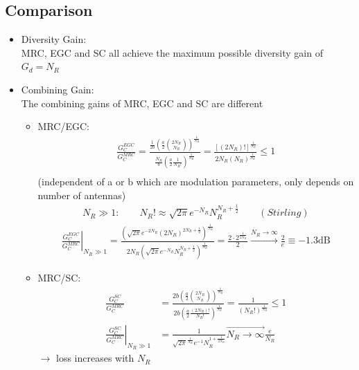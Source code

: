 \documentclass[a4paper, 10pt]{article}
\begin{document}
\subsection{Comparison}
	\begin{itemize}
		\item Diversity Gain:\\
			MRC, EGC and SC all achieve the maximum possible diversity gain of $G_d=N_R$
		\item Combining Gain:\\
			The combining gains of MRC, EGC and SC are different
			\begin{itemize}
			\item MRC/EGC:
			\begin{align*}
			\frac{G_C^{EGC}}{G_C^{MRC}}=\frac{\frac{1}{2b}\left(\frac{a}{2}\binom{2N_R}{N_R}\right)^{\frac{1}{N_R}}}{\frac{N_R}{b}\left(\frac{a}{2}\frac{1}{N_R!}\right)^{\frac{1}{N_R}}}
			=\frac{[(2N_R)!]^{\frac{1}{N_R}}}{2N_R(N_R)^{\frac{1}{N_R}}}\leq 1\\
			\end{align*}
			(independent of a or b which are modulation parameters, only depends on number of antennas)
			\begin{align*}
				N_R \gg 1: \qquad N_R!\approx \sqrt{2\pi}e^{-N_R}N_R^{N_R+\frac{1}{2}}\qquad(Stirling)
			\end{align*}
			\begin{align*}
				\left.\frac{G_C^{EGC}}{G_C^{MRC}}\right|_{N_R\gg1}
				=\frac{\left(\sqrt{2\pi}e^{-2N_R}(2N_R)^{2N_R+\frac{1}{2}}\right)^{\frac{1}{N_R}}}{2N_R\left(\sqrt{2\pi}e^{-N_R}N_R^{N_R+\frac{1}{2}}\right)^{\frac{1}{N_R}}}
				=\frac{2\cdot2^{\frac{1}{2N_R}}}{2}\overset{N_R\rightarrow\infty}{\rightarrow}\frac{2}{e}\equiv -1.3\mathrm{dB}
			\end{align*}
			\item MRC/SC:
			\begin{align*}
				\frac{G_C^{SC}}{G_C^{MRC}}
				&=\frac{2b\left(\frac{a}{2}\binom{2N_R}{N_R}\right)^{\frac{1}{N_R}}}{2b\left(\frac{a}{2}\frac{(2N_R)!}{N_R!}\right)^{\frac{1}{N_R}}}
				=\frac{1}{(N_R!)^{\frac{1}{N_R}}} \leq 1\\
				\left.\frac{G_C^{SC}}{G_C^{MRC}}\right|_{N_R\gg1}&=\frac{1}{\sqrt{2\pi}^{\frac{1}{N_R}}e^{-1}N_R^{1+\frac{1}{2N_R}}}\overset{\rightarrow}{N_R\rightarrow\infty}\frac{e}{N_R}
			\end{align*}
			$\rightarrow$ loss increases with $N_R$
			\end{itemize}
	\end{itemize}
\end{document}
